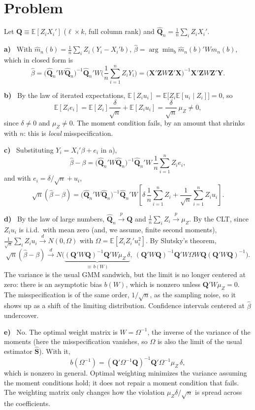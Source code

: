 \documentclass[11pt]{article}
\newcommand{\E}{\mathbb{E}}
\newcommand{\symbf}[1]{\boldsymbol{#1}}
\newcounter{problem}
\renewcommand{\theproblem}{\arabic{problem}}
\newcommand{\problem}{
	\stepcounter{problem}
	\section*{Problem \theproblem}
}
\newcommand{\itm}[1]{\par\textbf{#1)}\ }
\begin{document}
\problem

Let $\symbf Q\equiv\E[Z_iX_i']$ ($\ell\times k$, full column rank) and $\hat{\symbf Q}_n=\frac1n\sum_iZ_iX_i'$.

\itm{a}
With $\hat m_n(b)=\frac1n\sum_iZ_i(Y_i-X_i'b)$, $\hat\beta=\arg\min_b\hat m_n(b)'W\hat m_n(b)$, which in closed form is
\[
\hat\beta=\big(\hat{\symbf Q}_n'W\hat{\symbf Q}_n\big)^{-1}\hat{\symbf Q}_n'W\Big(\frac1n\sum_{i=1}^nZ_iY_i\Big)=\big(\symbf X'\symbf ZW\symbf Z'\symbf X\big)^{-1}\symbf X'\symbf ZW\symbf Z'\symbf Y .
\]

\itm{b}
By the law of iterated expectations, $\E[Z_iu_i]=\E\big[Z_i\E[u_i\mid Z_i]\big]=0$, so
\[
\E[Z_ie_i]=\E[Z_i]\frac{\delta}{\sqrt n}+\E[Z_iu_i]=\frac{\delta}{\sqrt n}\,\mu_Z\neq0,
\]
since $\delta\neq0$ and $\mu_Z\neq0$. The moment condition fails, by an amount that shrinks with $n$: this is \emph{local} misspecification.

\itm{c}
Substituting $Y_i=X_i'\beta+e_i$ in a),
\[
\hat\beta-\beta=\big(\hat{\symbf Q}_n'W\hat{\symbf Q}_n\big)^{-1}\hat{\symbf Q}_n'W\,\frac1n\sum_{i=1}^nZ_ie_i,
\]
and with $e_i=\delta/\sqrt n+u_i$,
\[
\sqrt n(\hat\beta-\beta)=\big(\hat{\symbf Q}_n'W\hat{\symbf Q}_n\big)^{-1}\hat{\symbf Q}_n'W\left[\delta\,\frac1n\sum_{i=1}^nZ_i+\frac1{\sqrt n}\sum_{i=1}^nZ_iu_i\right].
\]

\itm{d}
By the law of large numbers, $\hat{\symbf Q}_n\xrightarrow{p}\symbf Q$ and $\frac1n\sum_iZ_i\xrightarrow{p}\mu_Z$. By the CLT, since $Z_iu_i$ is i.i.d.\ with mean zero (and, we assume, finite second moments), $\frac1{\sqrt n}\sum_iZ_iu_i\xrightarrow{d}N(0,\Omega)$ with $\Omega=\E[Z_iZ_i'u_i^2]$. By Slutsky's theorem,
\[
\sqrt n(\hat\beta-\beta)\xrightarrow{d}N\Big(\underbrace{(\symbf Q'W\symbf Q)^{-1}\symbf Q'W\mu_Z\,\delta}_{\equiv\,b(W)},\ (\symbf Q'W\symbf Q)^{-1}\symbf Q'W\Omega W\symbf Q(\symbf Q'W\symbf Q)^{-1}\Big).
\]
The variance is the usual GMM sandwich, but the limit is no longer centered at zero: there is an asymptotic bias $b(W)$, which is nonzero unless $\symbf Q'W\mu_Z=0$. The misspecification is of the same order, $1/\sqrt n$, as the sampling noise, so it shows up as a shift of the limiting distribution. Confidence intervals centered at $\hat\beta$ undercover.

\itm{e}
No. The optimal weight matrix is $W=\Omega^{-1}$, the inverse of the variance of the moments (here the misspecification vanishes, so $\Omega$ is also the limit of the usual estimator $\hat{\symbf S}$). With it,
\[
b(\Omega^{-1})=(\symbf Q'\Omega^{-1}\symbf Q)^{-1}\symbf Q'\Omega^{-1}\mu_Z\,\delta,
\]
which is nonzero in general. Optimal weighting minimizes the variance assuming the moment conditions hold; it does not repair a moment condition that fails. The weighting matrix only changes how the violation $\mu_Z\delta/\sqrt n$ is spread across the coefficients.
\end{document}
